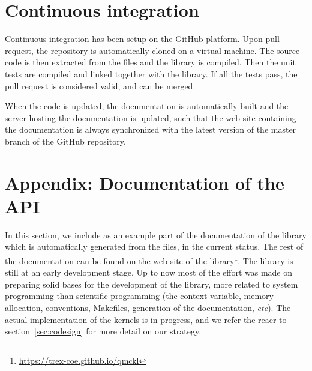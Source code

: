 \section{Continuous integration}

Continuous integration has been setup on the GitHub platform. Upon
pull request, the repository is automatically cloned on a virtual
machine. The source code is then extracted from the {\orgmode}
files and the library is compiled. Then the unit tests are compiled
and linked together with the library. If all the tests pass, the
pull request is considered valid, and can be merged.

When the code is updated, the documentation is automatically built and
the server hosting the documentation is updated, such that the web
site containing the documentation is always synchronized with the
latest version of the master branch of the GitHub repository.



\appendix
\section{Appendix: Documentation of the API}

In this section, we include as an example part of the documentation of
the library which is automatically generated from the {\orgmode}
files, in the current status. The rest of the documentation can be
found on the web site of the library\footnote{\url{https://trex-coe.github.io/qmckl}}.
The library is still at an early development stage. Up to now most of
the effort was made on preparing solid bases for the development of
the library, more related to system programming than scientific
programming (the context variable, memory allocation, conventions,
Makefiles, generation of the documentation, \textit{etc}). The actual
implementation of the kernels is in progress, and we refer the
reaer to section~\ref{sec:codesign} for more detail on our strategy.


\clearpage



